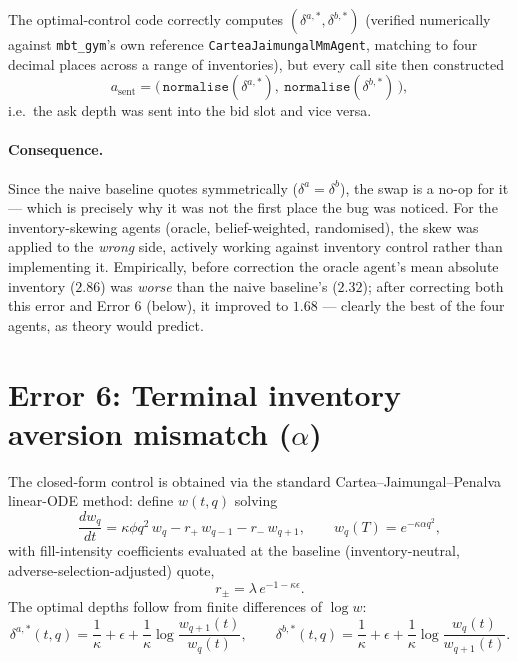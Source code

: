 \documentclass[11pt]{article}
\begin{document}
The optimal-control code correctly computes $(\delta^{a,*}, \delta^{b,*})$ (verified numerically against \texttt{mbt\_gym}'s own reference \texttt{CarteaJaimungalMmAgent}, matching to four decimal places across a range of inventories), but every call site then constructed
\begin{equation}
a_{\text{sent}} = \big(\,\texttt{normalise}(\delta^{a,*}),\ \texttt{normalise}(\delta^{b,*})\,\big),
\end{equation}
i.e.\ the ask depth was sent into the bid slot and vice versa.

\paragraph{Consequence.} Since the naive baseline quotes symmetrically ($\delta^a = \delta^b$), the swap is a no-op for it — which is precisely why it was not the first place the bug was noticed. For the inventory-skewing agents (oracle, belief-weighted, randomised), the skew was applied to the \emph{wrong} side, actively working against inventory control rather than implementing it. Empirically, before correction the oracle agent's mean absolute inventory ($2.86$) was \emph{worse} than the naive baseline's ($2.32$); after correcting both this error and Error 6 (below), it improved to $1.68$ — clearly the best of the four agents, as theory would predict.

\section{Error 6: Terminal inventory aversion mismatch ($\alpha$)}
\label{sec:control}

The closed-form control is obtained via the standard Cartea--Jaimungal--Penalva linear-ODE method: define $w(t,q)$ solving
\begin{equation}
\frac{dw_q}{dt} = \kappa \phi q^2\, w_q - r_+\, w_{q-1} - r_-\, w_{q+1}, \qquad
w_q(T) = e^{-\kappa \alpha q^2},
\label{eq:hjb}
\end{equation}
with fill-intensity coefficients evaluated at the baseline (inventory-neutral, adverse-selection-adjusted) quote,
\begin{equation}
r_\pm = \lambda\, e^{-1 - \kappa \epsilon}.
\end{equation}
The optimal depths follow from finite differences of $\log w$:
\begin{equation}
\delta^{a,*}(t,q) = \frac1\kappa + \epsilon + \frac1\kappa \log\frac{w_{q+1}(t)}{w_q(t)}, \qquad
\delta^{b,*}(t,q) = \frac1\kappa + \epsilon + \frac1\kappa \log\frac{w_{q}(t)}{w_{q+1}(t)}.
\end{equation}
\end{document}
